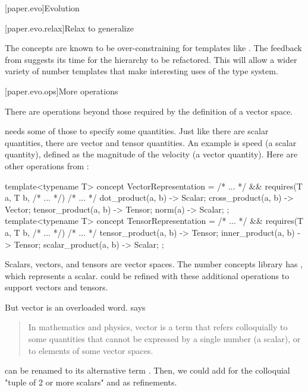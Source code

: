 

[paper.evo]{Evolution}

[paper.evo.relax]{Relax to generalize}

\pnum
The concepts are known to be over-constraining for templates like .
The feedback from \hrefVII{} suggests its time for the hierarchy to be refactored.
This will allow a wider variety of number templates that make interesting uses of the type system.
\wheredevelisat

[paper.evo.ops]{More operations}

\pnum
There are operations beyond those required by the definition of a vector space.

\pnum
{} needs some of those to specify some quantities.
Just like there are scalar quantities, there are vector and tensor quantities.
An example is speed (a scalar quantity),
defined as the magnitude of the velocity (a vector quantity).
Here are other operations from \hrefXI{}:
\begin{codeblock}
template<typename T>
concept VectorRepresentation = /* ... */ &&
  requires(T a, T b, /* ... */) {
    /* ... */
    { dot_product(a, b) } -> Scalar;
    { cross_product(a, b) } -> Vector;
    { tensor_product(a, b) } -> Tensor;
    { norm(a) } -> Scalar;
  };
template<typename T>
concept TensorRepresentation = /* ... */ &&
  requires(T a, T b, /* ... */) {
    /* ... */
    { tensor_product(a, b) } -> Tensor;
    { inner_product(a, b) } -> Tensor;
    { scalar_product(a, b) } -> Scalar;
  };
\end{codeblock}

\pnum
Scalars, vectors, and tensors are vector spaces.
The number concepts library has , which represents a scalar.
 could be refined with these additional operations to support vectors and tensors.

\pnum
But vector is an overloaded word.
 says
\begin{quote}
In mathematics and physics,
vector is a term that refers colloquially to some quantities
that cannot be expressed by a single number (a scalar),
or to elements of some vector spaces.
\end{quote}
 can be renamed to its alternative term .
Then, we could add  for the colloquial "tuple of 2 or more scalars" and  as refinements.

